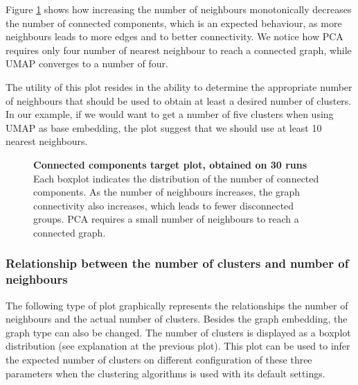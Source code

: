 Figure \ref{fig:ca-conn-comp} shows how increasing the number of neighbours monotonically decreases the number of connected components, which is an expected behaviour, as more neighbours leads to more edges and to better connectivity. We notice how PCA requires only four number of nearest neighbour to reach a connected graph, while UMAP converges to a number of four. 

The utility of this plot resides in the ability to determine the appropriate number of neighbours that should be used to obtain at least a desired number of clusters. In our example, if we would want to get a number of five clusters when using UMAP as base embedding, the plot suggest that we should use at least 10 nearest neighbours.

\begin{figure}[H]
    \centering
    \caption{\label{fig:ca-conn-comp}\textbf{Connected components target plot, obtained on 30 runs} Each boxplot indicates the distribution of the number of connected components. As the number of neighbours increases, the graph connectivity also increases, which leads to fewer disconnected groups. PCA requires a small number of neighbours to reach a connected graph.}
\end{figure}

\subsubsection{Relationship between the number of clusters and number of neighbours}
The following type of plot graphically represents the relationships the number of neighbours and the actual number of clusters. Besides the graph embedding, the graph type can also be changed. The number of clusters is displayed as a boxplot distribution (see explanation at the previous plot). This plot can be used to infer the expected number of clusters on different configuration of these three parameters when the clustering algorithms is used with its default settings.

